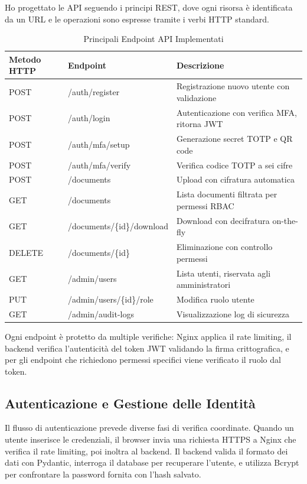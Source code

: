 \documentclass[12pt, a4paper]{article}
\begin{document}
Ho progettato le API seguendo i principi REST, dove ogni risorsa è identificata da un URL e le operazioni sono espresse tramite i verbi HTTP standard.

\begin{table}[H]
\centering
\caption{Principali Endpoint API Implementati}
\begin{tabular}{@{}p{2.5cm}p{5.5cm}p{4.5cm}@{}}
\toprule
\textbf{Metodo HTTP} & \textbf{Endpoint} & \textbf{Descrizione} \\ \midrule
POST & /auth/register & Registrazione nuovo utente con validazione \\
POST & /auth/login & Autenticazione con verifica MFA, ritorna JWT \\
POST & /auth/mfa/setup & Generazione secret TOTP e QR code \\
POST & /auth/mfa/verify & Verifica codice TOTP a sei cifre \\ \midrule
POST & /documents & Upload con cifratura automatica \\
GET & /documents & Lista documenti filtrata per permessi RBAC \\
GET & /documents/\{id\}/download & Download con decifratura on-the-fly \\
DELETE & /documents/\{id\} & Eliminazione con controllo permessi \\ \midrule
GET & /admin/users & Lista utenti, riservata agli amministratori \\
PUT & /admin/users/\{id\}/role & Modifica ruolo utente \\
GET & /admin/audit-logs & Visualizzazione log di sicurezza \\ \bottomrule
\end{tabular}
\end{table}

Ogni endpoint è protetto da multiple verifiche: Nginx applica il rate limiting, il backend verifica l'autenticità del token JWT validando la firma crittografica, e per gli endpoint che richiedono permessi specifici viene verificato il ruolo dal token.

\subsection{Autenticazione e Gestione delle Identità}

Il flusso di autenticazione prevede diverse fasi di verifica coordinate. Quando un utente inserisce le credenziali, il browser invia una richiesta HTTPS a Nginx che verifica il rate limiting, poi inoltra al backend. Il backend valida il formato dei dati con Pydantic, interroga il database per recuperare l'utente, e utilizza Bcrypt per confrontare la password fornita con l'hash salvato.
\end{document}
